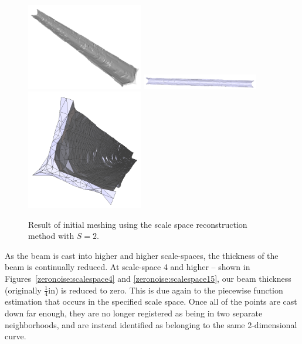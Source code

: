 \documentclass[12pt]{drexelthesis}
\begin{document}
\begin{figure}[!ht]
	\centering
		\includegraphics[width=2in]{simulated-lab-scan/0noise/clean/scale200.png}
		\includegraphics[width=2in]{simulated-lab-scan/0noise/clean/scalespace201.png}
		\includegraphics[width=2in]{simulated-lab-scan/0noise/clean/scalespace202.png}
		\caption[Initial meshing using a scale space reconstruction with $S = 2$]{\centering  Result of initial meshing using the scale space reconstruction method with $S = 2$.}
	\label{zeronoise:scalespace2}
\end{figure}

As the beam is cast into higher and higher scale-spaces, the thickness of the beam is continually reduced. At scale-space 4 and higher -- shown in Figures~\ref{zeronoise:scalespace4} and \ref{zeronoise:scalespace15}, our beam thickness (originally $\frac{1}{4}$in) is reduced to zero. This is due again to the piecewise function estimation that occurs in the specified scale space. Once all of the points are cast down far enough, they are no longer registered as being in two separate neighborhoods, and are instead identified as belonging to the same 2-dimensional curve.
\end{document}
